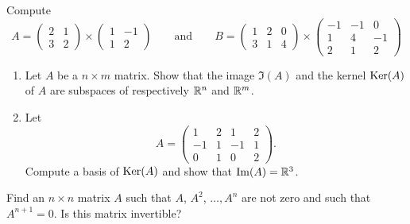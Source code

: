 \documentclass[11pt,nocut]{article}
\begin{document}
\begin{problem}[2 points]
	Compute
	$$
	A
	= \begin{pmatrix}
		2 & 1 \\
		3 & 2
	 \end{pmatrix}
	 \times
	 \begin{pmatrix}
		 1 & -1 \\
		 1 & 2
	 \end{pmatrix}
	 \qquad \text{and} \qquad
	 B = 
	 \begin{pmatrix}
		 1 & 2 & 0 \\
		 3 & 1 & 4
	 \end{pmatrix}
	 \times
	 \begin{pmatrix}
		 -1 & -1 & 0 \\
		 1 & 4 & -1 \\
		 2 & 1 & 2 
	 \end{pmatrix}
	$$
\end{problem}

\begin{problem}[3 points]\leavevmode
	\begin{enumerate}[label=\normalfont(\textbf{\alph*})]
		\item Let $A$ be a $n \times m$ matrix. Show that the image $\Im(A)$ and the kernel ${{\rm Ker}}(A)$ of $A$ are subspaces of respectively $\mathbb{R}^n$ and $\mathbb{R}^m$.
		\item Let
			$$
			A = 
			\begin{pmatrix}
				1 & 2 & 1 & 2 \\
				-1 & 1 & -1 & 1 \\
				0 & 1 & 0 & 2 
			\end{pmatrix}.
			$$
			Compute a basis of ${{\rm Ker}}(A)$ and show that ${{\rm Im}}(A) = \mathbb{R}^3$.
	\end{enumerate}
\end{problem}

\begin{problem}[$\star$]
	Find an $n \times n$ matrix $A$ such that $A$, $A^2$, $\dots, A^n$ are not zero and such that $A^{n+1} = 0$. Is this matrix invertible?
\end{problem}

\vspace{1mm}

\vspace{1cm}
\centerline{}

%
%
\end{document}
